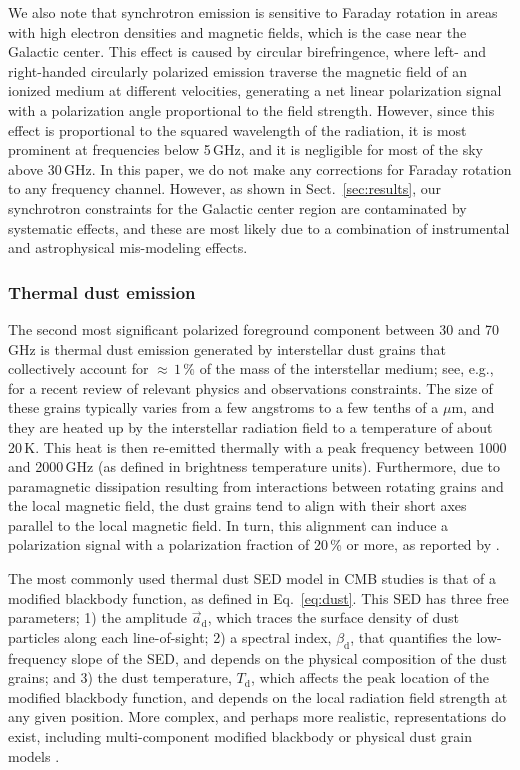\documentclass[twocolumn]{aa}
\renewcommand{\a}[0]{\vec{a}}
\newcommand{\?}[1]{\textcolor{red}{{\bf [#1]}}}
\begin{document}
We also note that synchrotron emission is sensitive to Faraday
rotation \citep[e.g.,][]{beck:2013} in areas with high electron
densities and magnetic fields, which is the case near the Galactic
center. This effect is caused by circular birefringence, where left-
and right-handed circularly polarized emission traverse the magnetic
field of an ionized medium at different velocities, generating a net
linear polarization signal with a polarization angle proportional to
the field strength. However, since this effect is proportional to the
squared wavelength of the radiation, it is most prominent at
frequencies below 5\,GHz, and it is negligible for most of the sky
above 30\,GHz. In this paper, we do not make any corrections for
Faraday rotation to any frequency channel. However, as shown in
Sect.~\ref{sec:results}, our synchrotron constraints for the Galactic
center region are contaminated by systematic effects, and
these are most likely due to a combination of instrumental and
astrophysical mis-modeling effects.

\subsubsection{Thermal dust emission}

The second most significant polarized foreground component between 30
and 70\,GHz is thermal dust emission generated by interstellar dust
grains that collectively account for $\approx$$\,1\,\%$ of the mass of
the interstellar medium; see, e.g., \citet{hensley2020} for a recent
review of relevant physics and observations constraints. The size of
these grains typically varies from a few angstroms to a few tenths of
a $\mu\mathrm{m}$, and they are heated up by the interstellar
radiation field to a temperature of about 20\,K. This heat is then
re-emitted thermally with a peak frequency between 1000 and 2000\,GHz
(as defined in brightness temperature units). Furthermore, due to
paramagnetic dissipation resulting from interactions between rotating
grains and the local magnetic field, the dust grains tend to align
with their short axes parallel to the local magnetic field. In turn,
this alignment can induce a polarization signal with a polarization
fraction of 20\,\% or more, as reported by \citet{planck2016-l11A}.

The most commonly used thermal dust SED model in CMB studies is that of a modified blackbody
function, as defined in Eq.~\eqref{eq:dust}. This SED has three free
parameters; 1) the amplitude $\a_{\mathrm d}$, which traces the
surface density of dust particles along each line-of-sight; 2) a
spectral index, $\beta_{\mathrm d}$, that quantifies the low-frequency
slope of the SED, and depends on the physical composition of the dust
grains; and 3) the dust temperature, $T_{\mathrm d}$, which affects
the peak location of the modified blackbody function, and depends on
the local radiation field strength at any given position. More
complex, and perhaps more realistic, representations do exist,
including multi-component modified blackbody
\citep[e.g.,][]{finkbeiner1999, meisner2015} or physical dust grain
models \citep[][]{guillet2018}. 
\end{document}
